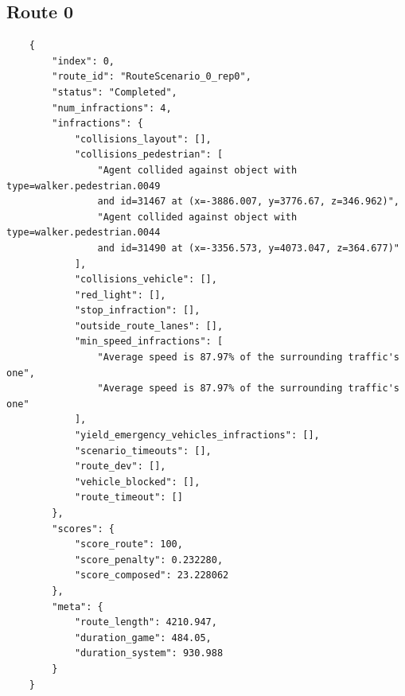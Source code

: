 \documentclass{article}
\begin{document}
\subsection{Route 0}
\begin{verbatim}
    {
        "index": 0,
        "route_id": "RouteScenario_0_rep0",
        "status": "Completed",
        "num_infractions": 4,
        "infractions": {
            "collisions_layout": [],
            "collisions_pedestrian": [
                "Agent collided against object with type=walker.pedestrian.0049
                and id=31467 at (x=-3886.007, y=3776.67, z=346.962)",
                "Agent collided against object with type=walker.pedestrian.0044
                and id=31490 at (x=-3356.573, y=4073.047, z=364.677)"
            ],
            "collisions_vehicle": [],
            "red_light": [],
            "stop_infraction": [],
            "outside_route_lanes": [],
            "min_speed_infractions": [
                "Average speed is 87.97% of the surrounding traffic's one",
                "Average speed is 87.97% of the surrounding traffic's one"
            ],
            "yield_emergency_vehicles_infractions": [],
            "scenario_timeouts": [],
            "route_dev": [],
            "vehicle_blocked": [],
            "route_timeout": []
        },
        "scores": {
            "score_route": 100,
            "score_penalty": 0.232280,
            "score_composed": 23.228062
        },
        "meta": {
            "route_length": 4210.947,
            "duration_game": 484.05,
            "duration_system": 930.988
        }
    }
\end{verbatim}
\clearpage
\end{document}

